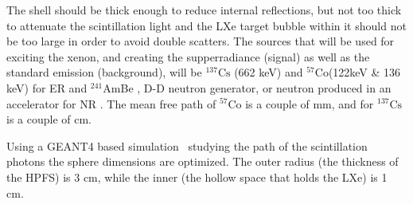 The shell should be thick enough to reduce internal reflections, but not 
too thick to attenuate the scintillation light and the LXe target bubble within it should not be too large in order to avoid double scatters. The sources that will be used for exciting the xenon, and creating the supperradiance 
(signal) as well as the standard emission (background), will be $^{137} \mathrm{Cs}$ 
(662 keV) and $^{57} \mathrm{Co}$(122keV \& 136 keV) for ER and $^{241}$AmBe , 
D-D neutron generator, or neutron produced in an accelerator for NR . The mean 
free path of $^{57} \mathrm{Co}$ is a couple of mm, and for $^{137} \mathrm{Cs}$ is a couple of cm.

Using a GEANT4 based simulation~\cite{AGOSTINELLI2003250} studying the path of the scintillation photons the sphere dimensions are optimized. The outer radius (the thickness of the HPFS) is 3 cm, while the inner (the hollow space that holds the LXe) is 1 cm. 

